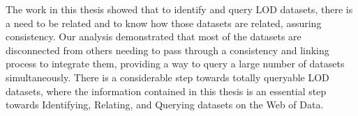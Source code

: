 The work in this thesis showed that to identify and query LOD datasets, there is a need to be related and to know how those datasets are related, assuring consistency. Our analysis demonstrated that most of the datasets are disconnected from others needing to pass through a consistency and linking process to integrate them, providing a way to query a large number of datasets simultaneously. There is a considerable step towards totally queryable LOD datasets, where the information contained in this thesis is an essential step towards Identifying, Relating, and Querying datasets on the Web of Data.